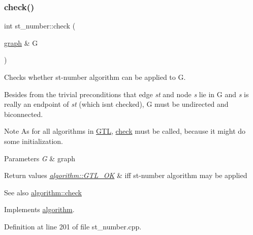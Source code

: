 \subsubsection{\texorpdfstring{check()}{check()}}
{\footnotesize\ttfamily int st\+\_\+number\+::check (\begin{DoxyParamCaption}\item[{\mbox{\hyperlink{classgraph}{graph}} \&}]{G }\end{DoxyParamCaption})\hspace{0.3cm}{\ttfamily [virtual]}}



Checks whether st-\/number algorithm can be applied to {\ttfamily G}. 

Besides from the trivial preconditions that edge {\itshape st} and node {\itshape s} lie in {\ttfamily G} and {\itshape s} is really an endpoint of {\itshape st} (which isn\textquotesingle{}t checked), {\ttfamily G} must be undirected and biconnected. \begin{DoxyNote}{Note}
As for all algorithms in \mbox{\hyperlink{namespace_g_t_l}{G\+TL}}, \mbox{\hyperlink{classst__number_a2aad4550b821c52d6998bff35fd8648f}{check}} must be called, because it might do some initialization.
\end{DoxyNote}

\begin{DoxyParams}{Parameters}
{\em G} & graph\\
\hline
\end{DoxyParams}

\begin{DoxyRetVals}{Return values}
{\em \mbox{\hyperlink{classalgorithm_af1a0078e153aa99c24f9bdf0d97f6710a5114c20e4a96a76b5de9f28bf15e282b}{algorithm\+::\+G\+T\+L\+\_\+\+OK}}} & iff st-\/number algorithm may be applied\\
\hline
\end{DoxyRetVals}
\begin{DoxySeeAlso}{See also}
\mbox{\hyperlink{classalgorithm_a76361fb03ad1cf643affc51821e43bed}{algorithm\+::check}} 
\end{DoxySeeAlso}


Implements \mbox{\hyperlink{classalgorithm_a76361fb03ad1cf643affc51821e43bed}{algorithm}}.



Definition at line 201 of file st\+\_\+number.\+cpp.


